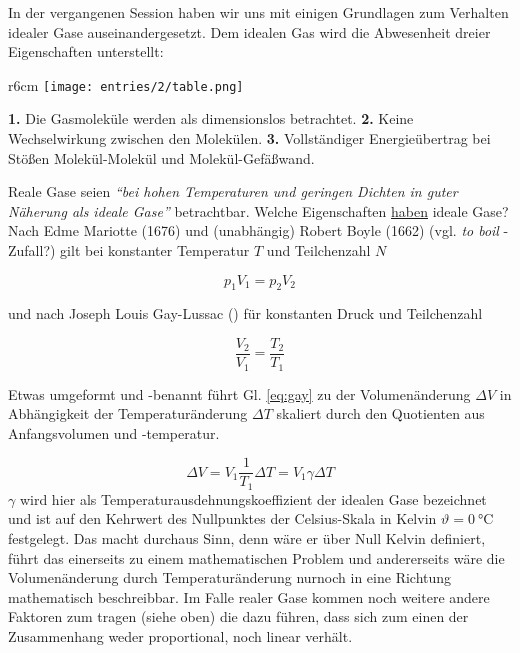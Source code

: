 In der vergangenen Session haben wir uns mit einigen Grundlagen zum Verhalten idealer Gase auseinandergesetzt. Dem idealen Gas wird die Abwesenheit dreier Eigenschaften unterstellt:
\begin{wrapfigure}{r}{6cm}
    \centering
    \texttt{[image: entries/2/table.png]}
    \label{fig:table}
\end{wrapfigure}

\textbf{1.} Die Gasmoleküle werden als dimensionslos \mbox{betrachtet}. \newline 
\textbf{2.} Keine Wechselwirkung zwischen den \mbox{Molekülen}. \newline 
\textbf{3.} Vollständiger Energieübertrag bei Stößen \mbox{Molekül-Molekül} und Molekül-Gefäßwand.\newline

Reale Gase seien \textit{``bei hohen Temperaturen und geringen Dichten in guter Näherung als ideale Gase''} betrachtbar. Welche Eigenschaften \underline{haben} ideale Gase?
Nach \mbox{Edme} \mbox{Mariotte} (1676) und (unabhängig) \mbox{Robert} \mbox{Boyle} (1662) (vgl. \textit{to boil} - Zufall?) gilt bei konstanter Temperatur \(T\) und Teilchenzahl \(N\)

\begin{equation}
    p_1V_1=p_2V_2
\end{equation}

und nach Joseph Louis Gay-Lussac () für konstanten Druck und Teilchenzahl

\begin{equation}
    \frac{V_2}{V_1}=\frac{T_2}{T_1}
    \label{eq:gay}
\end{equation}

Etwas umgeformt und -benannt führt Gl. \ref{eq:gay} zu der Volumenänderung \(\Delta V\) in Abhängigkeit der Temperaturänderung \(\Delta T\) skaliert durch den Quotienten aus
Anfangsvolumen und -temperatur.

\begin{equation}
    \Delta V = V_1 \frac{1}{T_1} \Delta T = V_1 \gamma \Delta T
\end{equation}
\(\gamma\) wird hier als Temperaturausdehnungskoeffizient der idealen Gase bezeichnet und ist auf den Kehrwert des Nullpunktes der Celsius-Skala in Kelvin \(\vartheta  = \SI{0}{\celsius}\) festgelegt.
Das macht durchaus Sinn, denn wäre er über Null Kelvin definiert, führt das einerseits zu einem mathematischen Problem und andererseits wäre die Volumenänderung durch Temperaturänderung nurnoch in
eine Richtung mathematisch beschreibbar. Im Falle realer Gase kommen noch weitere andere Faktoren zum tragen (siehe oben) die dazu führen, dass sich zum einen der Zusammenhang weder proportional, noch linear
verhält.\\

